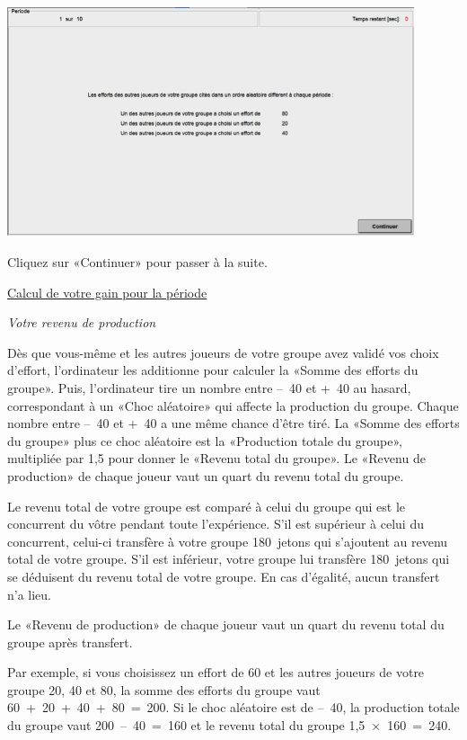 \begin{Article}
\begin{refsection}[Lebourges]
\begin{appendices}
\includegraphics[width = 0.9\textwidth]{05_fig13-annexII.png}

Cliquez sur «Continuer» pour passer à la suite.

\vspace{.2cm}
\ul{Calcul de votre gain pour la période}

\vspace{.2cm}
\emph{Votre revenu de production}

\vspace{.2cm}
Dès que vous-même et les autres joueurs de votre groupe avez validé vos
choix d'effort, l'ordinateur les additionne pour calculer la «Somme des
efforts du groupe». Puis, l'ordinateur tire un nombre entre --~40 et
+~40 au hasard, correspondant à un «Choc aléatoire» qui affecte la
production du groupe. Chaque nombre entre --~40 et +~40 a une même
chance d'être tiré. La «Somme des efforts du groupe» plus ce choc
aléatoire est la «Production totale du groupe», multipliée par 1,5
pour donner le «Revenu total du groupe». Le «Revenu de production»
de chaque joueur vaut un quart du revenu total du groupe.

Le revenu total de votre groupe est comparé à celui du groupe qui est le
concurrent du vôtre pendant toute l'expérience. S'il est supérieur à
celui du concurrent, celui-ci transfère à votre groupe 180~jetons qui
s'ajoutent au revenu total de votre groupe. S'il est inférieur, votre
groupe lui transfère 180~jetons qui se déduisent du revenu total de
votre groupe. En cas d'égalité, aucun transfert n'a lieu.

Le «Revenu de production» de chaque joueur vaut un quart du revenu
total du groupe après transfert.

Par exemple, si vous choisissez un effort de 60 et les autres joueurs de
votre groupe 20, 40 et 80, la somme des efforts du groupe vaut
60~+~20~+~40~+~80~=~200. Si le choc aléatoire est de --~40, la
production totale du groupe vaut 200~--~40~=~160 et le revenu total du
groupe 1,5~×~160~=~240.


\end{appendices}
\end{refsection}
\end{Article}

